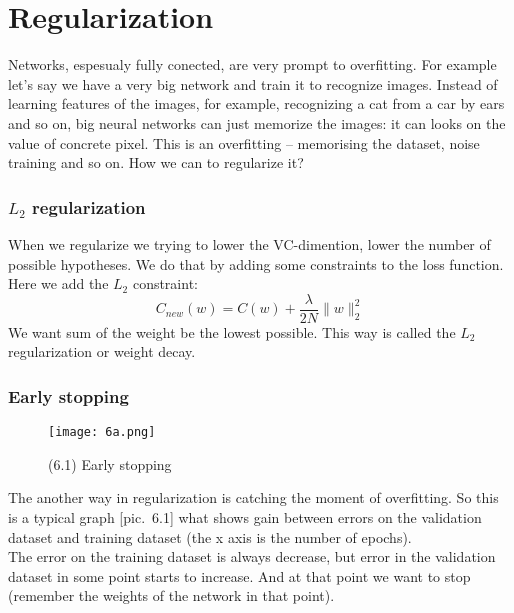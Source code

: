 \section{Regularization}

Networks, espesualy fully conected, are very prompt to overfitting. For example let's say we have a very big network and train it to recognize images. Instead of learning features of the images, for example, recognizing a cat from a car by ears and so on, big neural networks can just memorize the images: it can looks on the value of concrete pixel. This is an overfitting -- memorising the dataset,  noise training and so on. How we can to regularize it? 

\subsubsection*{$L_2$ regularization}

When we regularize we trying to lower the VC-dimention, lower the number of possible hypotheses. We do that by adding some constraints to the loss function. Here we add the $L_2$ constraint:
$$C_{new}(w)=C(w)+\frac{\lambda}{2N}\|w\|_2^2$$
We want sum of the weight be the lowest possible. This way is called the $L_2$ regularization or weight decay.

\subsubsection*{Early stopping}

\begin{wrapfigure}{r}{0.4\linewidth}
  \vspace{-1.3cm}
  \begin{center}
    \texttt{[image: 6a.png]}
  \end{center}
  \vspace{-0.3cm}
  \caption*{(6.1) Early stopping}
  \vspace{-1.5cm}
\end{wrapfigure}
The another way in regularization is catching the moment of overfitting. So this is a typical graph [pic.~6.1] what shows gain between errors on the validation dataset and training dataset (the x axis is the number of epochs).\\
The error on the training dataset is always decrease, but error in the validation dataset in some point starts to increase. And at that point we want to stop (remember the weights of the network in that point).

